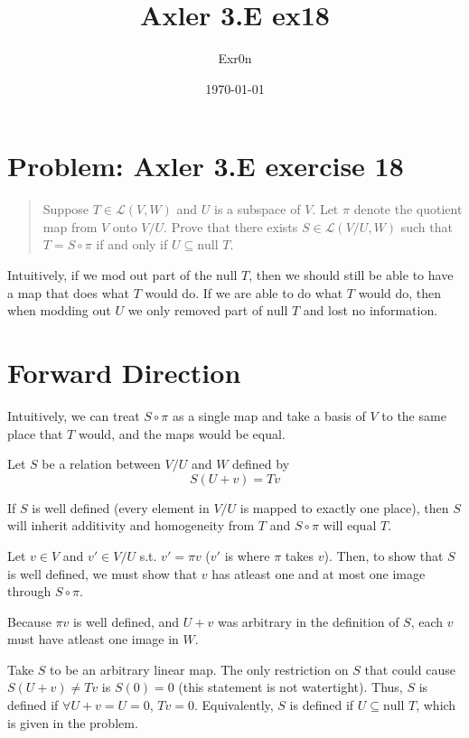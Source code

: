 \documentclass[letterpaper]{article}
\author{Exr0n}
\date{\today}
\title{Axler 3.E ex18}
\renewcommand\maketitle{}
\begin{document}
\maketitle
\section{Problem: Axler 3.E exercise 18}
\label{sec:org17c3dc0}
\begin{quote}
Suppose \(T \in \mathcal L(V, W)\) and \(U\) is a subspace of \(V\). Let \(\pi\) denote the quotient map from \(V\) onto \(V/U\). Prove that there exists \(S \in \mathcal L(V/U, W)\) such that \(T = S \circ \pi\) if and only if \(U \subseteq \text{null }T\).
\end{quote}
Intuitively, if we mod out part of the \(\text{null }T\), then we should still be able to have a map that does what \(T\) would do. If we are able to do what \(T\) would do, then when modding out \(U\) we only removed part of \(\text{null }T\) and lost no information.

\section{Forward Direction}
\label{sec:org114a03a}

Intuitively, we can treat \(S \circ \pi\) as a single map and take a basis of \(V\) to the same place that \(T\) would, and the maps would be equal.

Let \(S\) be a relation between \(V/U\) and \(W\) defined by
\[ S(U+v) = Tv \]

If \(S\) is well defined (every element in \(V/U\) is mapped to exactly one place), then \(S\) will inherit additivity and homogeneity from \(T\) and \(S \circ \pi\) will equal \(T\).

Let \(v \in V\) and \(v' \in V/U\) s.t. \(v' = \pi v\) (\(v'\) is where \(\pi\) takes \(v\)). Then, to show that \(S\) is well defined, we must show that \(v\) has atleast one and at most one image through \(S \circ \pi\).

Because \(\pi v\) is well defined, and \(U+v\) was arbitrary in the definition of \(S\), each \(v\) must have atleast one image in \(W\).

Take \(S\) to be an arbitrary linear map. The only restriction on \(S\) that could cause \(S(U+v) \neq Tv\) is \(S(0) = 0\) (this statement is not watertight).
Thus, \(S\) is defined if \(\forall U+v = U = 0\), \(Tv = 0\). Equivalently, \(S\) is defined if \(U \subseteq \text{null }T\), which is given in the problem.
\end{document}
